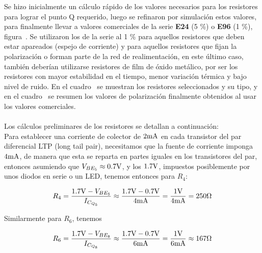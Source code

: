 
Se hizo inicialmente un cálculo rápido de los valores necesarios para los resistores para lograr el punto Q requerido, luego se refinaron por simulación estos valores, para finalmente llevar a valores comerciales de la serie \textbf{E24} (5 \%) o \textbf{E96} (1 \%), figura~. Se utilizaron los de la serie al 1 \% para aquellos resistores que deben estar apareados (espejo de corriente) y para aquellos resistores que fijan la polarización o forman parte de la red de realimentación, en este último caso, también deberían utilizarse resistores de film de óxido metálico, por ser los resistores con mayor estabilidad en el tiempo, menor variación térmica y bajo nivel de ruido. En el cuadro~ se muestran los resistores seleccionados y su tipo, y en el cuadro~ se resumen los valores de polarización finalmente obtenidos al usar los valores comerciales. \\ \\


Los cálculos preliminares de los resistores se detallan a continuación:\\


Para establecer una corriente de colector de $2 \si[per-mode=symbol]{\milli\ampere}$ en cada transistor del par diferencial LTP (long tail pair), necesitamos que la fuente de corriente imponga $4 \si[per-mode=symbol]{\milli\ampere}$, de manera que esta se reparta en partes iguales en los transistores del par, entonces asumiendo que $V_{BE_{5}} \approx 0.7 \si[per-mode=symbol]{\volt}$, y los $1.7 \si[per-mode=symbol]{\volt}$, impuestos posiblemente por unos diodos en serie o un LED, tenemos entonces para $R_{4}$:

\begin{equation*}
R_{4} = \frac{1.7 \si[per-mode=symbol]{\volt} - V_{BE_{5}}}{I_{C_{Q_{5}}}} \approx \frac{1.7 \si[per-mode=symbol]{\volt} - 0.7 \si[per-mode=symbol]{\volt}}{4 \si[per-mode=symbol]{\milli\ampere}} = \frac{1 \si[per-mode=symbol]{\volt}}{4 \si[per-mode=symbol]{\milli\ampere}} = 250 \si[per-mode=symbol]{\ohm}
\end{equation*}

Similarmente para $R_{6}$, tenemos


\begin{equation*}
R_{6} = \frac{1.7 \si[per-mode=symbol]{\volt} - V_{BE_{8}}}{I_{C_{Q_{8}}}} \approx \frac{1.7 \si[per-mode=symbol]{\volt} - 0.7 \si[per-mode=symbol]{\volt}}{6 \si[per-mode=symbol]{\milli\ampere}} = \frac{1 \si[per-mode=symbol]{\volt}}{6 \si[per-mode=symbol]{\milli\ampere}} \approx 167 \si[per-mode=symbol]{\ohm}
\end{equation*}


